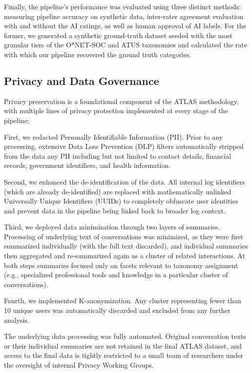 \documentclass[11pt,a4paper]{article}
\begin{document}
Finally, the pipeline’s performance was evaluated using three distinct methods: measuring pipeline accuracy on synthetic data, inter-rater agreement evaluation with and without the AI ratings, as well as  human approval of AI labels. For the former, we generated a synthetic ground-truth dataset seeded with the most granular tiers of the O*NET-SOC and ATUS taxonomies and calculated the rate with which our pipeline recovered the ground truth categories.  

\subsection{Privacy and Data Governance}\label{subsec:privacy_data_governance}

Privacy preservation is a foundational component of the ATLAS methodology, with multiple lines of privacy protection implemented at every stage of the pipeline:

First, we redacted Personally Identifiable Information (PII). Prior to any processing, extensive Data Loss Prevention (DLP) filters automatically stripped from the data any PII including but not limited to contact details, financial records, government identifiers, and health information.

Second, we enhanced the de-identification of the data. All internal log identifiers (which are already de-identified) are replaced with mathematically unlinked Universally Unique Identifiers (UUIDs) to completely obfuscate user identities and prevent data in the pipeline being linked back to broader log context.

Third, we deployed data minimization through two layers of summaries. Processing of underlying text of conversations was minimized, as they were first summarized individually (with the full text discarded), and individual summaries then aggregated and re-summarized again as a cluster of related interactions. At both steps summaries focused only on facets relevant to taxonomy assignment (e.g., specialized professional tools and knowledge in a particular cluster of conversations).

Fourth, we implemented K-anonymization. Any cluster representing fewer than 10 unique users was automatically discarded and excluded from any further analysis.

The underlying data processing was fully automated. Original conversation texts or their individual summaries are not retained in the final ATLAS dataset, and access to the final data is tightly restricted to a small team of researchers under the oversight of internal Privacy Working Groups.
\end{document}
